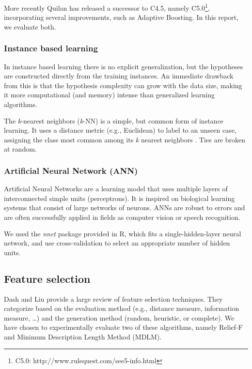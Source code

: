 \documentclass{article}
\begin{document}
More recently Quilan has released a successor to C4.5, namely C5.0\footnote{C5.0: http://www.rulequest.com/see5-info.html}, incorporating several improvements, such as Adaptive Boosting. In this report, we evaluate both.


\subsubsection{Instance based learning}
In instance based learning there is no explicit generalization, but the hypotheses are constructed directly from the training instances\cite{russell13artificial}. An immediate drawback from this is that the hypothesis complexity can grow with the data size, making it more computational (and memory) intense than generalized learning algorithms.

The \textit{k}-nearest neighbors (\textit{k}-NN) is a simple, but common form of instance learning. It uses a distance metric (e.g., Euclidean) to label to an unseen case, assigning  the class most common among its \textit{k} nearest neighbors \cite{aha1991instance}. Ties are broken at random.

\subsubsection{Artificial Neural Network (ANN)}

Artificial Neural Networks are a learning model that uses multiple layers of interconnected simple units (perceptrons). It is inspired on biological learning systems that consist of large networks of neurons. ANNs are robust to errors and are often successfully applied in fields as computer vision or speech recognition\cite{mitchell1997machine}. 

We used the \textit{nnet} package provided in R, which fits a single-hidden-layer neural network, and use cross-validation to select an appropriate number of hidden units.



\subsection{Feature selection}

Dash and Liu provide a large review of feature selection techniques\cite{dash1997feature}. They categorize based on the evaluation method (e.g., distance measure, information measure, \ldots) and the generation method (random, heuristic, or complete). 
We have chosen to experimentally evaluate two of these algorithms, namely Relief-F and Minimum Description Length Method (MDLM).
\end{document}
